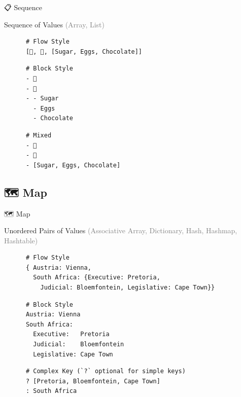\documentclass{beamer}
\begin{document}
\begin{frame}[fragile]{📋 Sequence}
  \begin{block}{Sequence of Values \textcolor{gray}{(Array, List)}}
    \vspace{0.3cm}

    \begin{verbatim}
      # Flow Style
      [🍎, 🍊, [Sugar, Eggs, Chocolate]]
    \end{verbatim}

    \vspace{0.1cm}

    \begin{verbatim}
      # Block Style
      - 🍎
      - 🍊
      - - Sugar
        - Eggs
        - Chocolate
    \end{verbatim}

    \vspace{0.1cm}

    \begin{verbatim}
      # Mixed
      - 🍎
      - 🍊
      - [Sugar, Eggs, Chocolate]
    \end{verbatim}
  \end{block}
\end{frame}

\subsection{🗺 Map}

\begin{frame}[fragile]{🗺 Map}
  \begin{block}{Unordered Pairs of Values}
    \textcolor{gray}{(Associative Array, Dictionary, Hash, Hashmap, Hashtable)}
    \vspace{0.2cm}

    \begin{verbatim}
      # Flow Style
      { Austria: Vienna,
        South Africa: {Executive: Pretoria,
          Judicial: Bloemfontein, Legislative: Cape Town}}
    \end{verbatim}

    \vspace{0.1cm}

    \begin{verbatim}
      # Block Style
      Austria: Vienna
      South Africa:
        Executive:   Pretoria
        Judicial:    Bloemfontein
        Legislative: Cape Town
    \end{verbatim}

    \vspace{0.1cm}

    \begin{verbatim}
      # Complex Key (`?` optional for simple keys)
      ? [Pretoria, Bloemfontein, Cape Town]
      : South Africa
    \end{verbatim}
  \end{block}
\end{frame}
\end{document}
